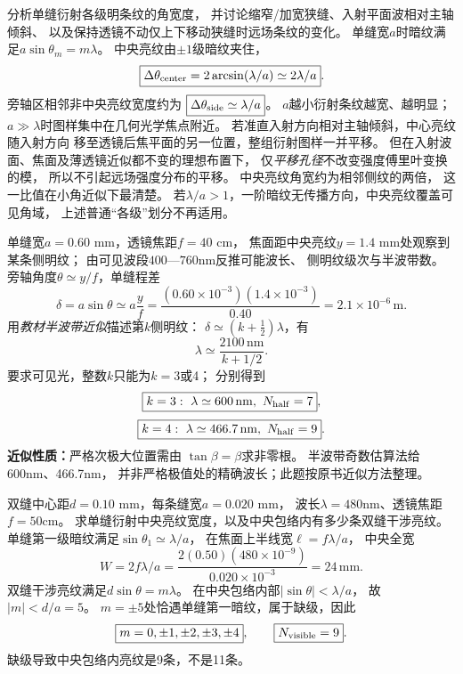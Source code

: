 
\problemtext 分析单缝衍射各级明条纹的角宽度，
并讨论缩窄/加宽狭缝、入射平面波相对主轴倾斜、
以及保持透镜不动仅上下移动狭缝时远场条纹的变化。
\workings
单缝宽$a$时暗纹满足$a\sin\theta_m=m\lambda$。
中央亮纹由$\pm1$级暗纹夹住，
\[
\boxed{\Delta\theta_{\rm center}
=2\arcsin(\lambda/a)\simeq2\lambda/a}.
\]
旁轴区相邻非中央亮纹宽度约为
$\boxed{\Delta\theta_{\rm side}\simeq\lambda/a}$。
$a$越小衍射条纹越宽、越明显；
$a\gg\lambda$时图样集中在几何光学焦点附近。
若准直入射方向相对主轴倾斜，中心亮纹随入射方向
移至透镜后焦平面的另一位置，整组衍射图样一并平移。
但在入射波面、焦面及薄透镜近似都不变的理想布置下，
仅\emph{平移孔径}不改变强度傅里叶变换的模，
所以不引起远场强度分布的平移。
\crosscheck 中央亮纹角宽约为相邻侧纹的两倍，
这一比值在小角近似下最清楚。
若$\lambda/a>1$，一阶暗纹无传播方向，中央亮纹覆盖可见角域，
上述普通“各级”划分不再适用。

\problemtext 单缝宽$a=0.60$ mm，透镜焦距$f=40$ cm，
焦面距中央亮纹$y=1.4$ mm处观察到某条侧明纹；
由可见波段$400$—$760$nm反推可能波长、
侧明纹级次与半波带数。
\workings
旁轴角度$\theta\simeq y/f$，单缝程差
\[
\delta=a\sin\theta\simeq a\frac yf
=\frac{(0.60\times10^{-3})(1.4\times10^{-3})}{0.40}
=2.1\times10^{-6}\,\mathrm m.
\]
用\emph{教材半波带近似}描述第$k$侧明纹：
$\delta\simeq(k+\tfrac12)\lambda$，有
\[
\lambda\simeq\frac{2100\,\mathrm{nm}}{k+1/2}.
\]
要求可见光，整数$k$只能为$k=3$或4；
分别得到
\[
\boxed{k=3:\ \lambda\simeq600\,\mathrm{nm},\ N_{\rm half}=7},
\]
\[
\boxed{k=4:\ \lambda\simeq466.7\,\mathrm{nm},\ N_{\rm half}=9}.
\]
\crosscheck \textbf{近似性质：}严格次极大位置需由
$\tan\beta=\beta$求非零根。
半波带奇数估算法给600nm、466.7nm，
并非严格极值处的精确波长；此题按原书近似方法整理。

\problemtext 双缝中心距$d=0.10$ mm，每条缝宽$a=0.020$ mm，
波长$\lambda=480$nm、透镜焦距$f=50$cm。
求单缝衍射中央亮纹宽度，以及中央包络内有多少条双缝干涉亮纹。
\workings
单缝第一级暗纹满足$\sin\theta_1\simeq\lambda/a$，
在焦面上半线宽$\ell=f\lambda/a$，
中央全宽
\[
\boxed{W=2f\lambda/a
=\frac{2(0.50)(480\times10^{-9})}{0.020\times10^{-3}}
=24\,\mathrm{mm}}.
\]
双缝干涉亮纹满足$d\sin\theta=m\lambda$。
在中央包络内部$|\sin\theta|<\lambda/a$，
故$|m|<d/a=5$。
$m=\pm5$处恰遇单缝第一暗纹，属于缺级，因此
\[
\boxed{m=0,\pm1,\pm2,\pm3,\pm4},\qquad
\boxed{N_{\rm visible}=9}.
\]
\crosscheck 缺级导致中央包络内亮纹是9条，不是11条。

